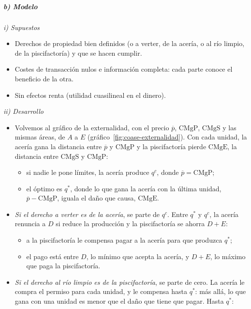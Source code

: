 \documentclass[11pt]{article}
\begin{document}
\subparagraph{b) Modelo}

\hspace*{3.6em}\emph{i) Supuestos}

\begin{itemize}
\item Derechos de propiedad bien definidos (o a verter, de la acería, o al río limpio, de la piscifactoría) y que se hacen cumplir.
\item Costes de transacción nulos e información completa: cada parte conoce el beneficio de la otra.
\item Sin efectos renta (utilidad cuasilineal en el dinero).
\end{itemize}

\hspace*{3.6em}\emph{ii) Desarrollo}

\begin{itemize}
\item Volvemos al gráfico de la externalidad, con el precio $\overline{p}$, $\mathrm{CMgP}$, $\mathrm{CMgS}$ y las mismas áreas, de $A$ a $E$ (gráfico~\ref{fig:coase-externalidad}). Con cada unidad, la acería gana la distancia entre $\overline{p}$ y $\mathrm{CMgP}$ y la piscifactoría pierde $\mathrm{CMgE}$, la distancia entre $\mathrm{CMgS}$ y $\mathrm{CMgP}$:
  \begin{itemize}
  \item si nadie le pone límites, la acería produce $q^c$, donde $\overline{p}=\mathrm{CMgP}$;
  \item el óptimo es $q^*$, donde lo que gana la acería con la última unidad, $\overline{p}-\mathrm{CMgP}$, iguala el daño que causa, $\mathrm{CMgE}$.
  \end{itemize}
\item \emph{Si el derecho a verter es de la acería}, se parte de $q^c$. Entre $q^*$ y $q^c$, la acería renuncia a $D$ si reduce la producción y la piscifactoría se ahorra $D+E$:
  \begin{itemize}
  \item a la piscifactoría le compensa pagar a la acería para que produzca $q^*$;
  \item el pago está entre $D$, lo mínimo que acepta la acería, y $D+E$, lo máximo que paga la piscifactoría.
  \end{itemize}
\item \emph{Si el derecho al río limpio es de la piscifactoría}, se parte de cero. La acería le compra el permiso para cada unidad, y le compensa hasta $q^*$: más allá, lo que gana con una unidad es menor que el daño que tiene que pagar. Hasta $q^*$:

\end{itemize}
\end{document}
